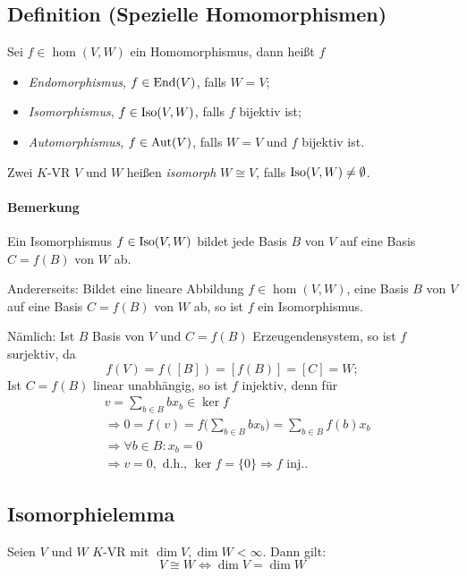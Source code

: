  \subsection{Definition (Spezielle Homomorphismen)}
 	\begin{Definition}
 		Sei $f\in \hom(V,W)$ ein Homomorphismus, dann heißt $f$
 		\begin{itemize}
 			\item \emph{Endomorphismus}, $f\in \operatorname{End} (V)$, falls $W = V$;
 			\item \emph{Isomorphismus}, $f\in \operatorname{Iso}(V,W)$, falls $f$ bijektiv ist;
 			\item \emph{Automorphismus}, $f\in \operatorname{Aut}(V)$, falls $W=V$ und $f$ bijektiv ist.
 		\end{itemize}

 		Zwei $K$-VR $V$ und $W$ heißen \emph{isomorph} $W \cong V$, falls $\operatorname{Iso}(V,W) \neq \emptyset$.
 	\end{Definition}

 	\paragraph{Bemerkung}
 		Ein Isomorphismus $f\in \operatorname{Iso}(V,W)$ bildet jede Basis $B$ von $V$ auf eine Basis $C = f(B)$ von $W$ ab.

 		Andererseits: Bildet eine lineare Abbildung $f\in \hom(V,W)$, eine Basis $B$ von $V$ auf eine Basis $C = f(B)$ von $W$ ab, so ist $f$ ein Isomorphismus.

 		Nämlich: Ist $B$ Basis von $V$ und $ C = f(B)$ Erzeugendensystem, so ist $f$ surjektiv, da
 		\[
 			f(V) = f ([B]) = [f(B)] = [C] = W;
 		\]
 		Ist $C =f(B)$ linear unabhängig, so ist $f$ injektiv, denn für
 		\begin{align*}
 			  & v = \sum_{b\in B} bx_b \in \ker f                                            \\
 			  & \Rightarrow 0 = f(v) = f\Big(\sum_{b\in B}bx_b\Big) = \sum_{b\in B}f(b)x_b   \\
 			  & \Rightarrow \forall b \in B: x_b = 0                                         \\
 			  & \Rightarrow v = 0, \text{ d.h., } \ker f=\{{0}\} \Rightarrow f \text{ inj.}.
 		\end{align*}

 \subsection{Isomorphielemma}
 	\begin{Lemma}[Isomorphielemma]
 		Seien $V$ und $W$ $ K $-VR mit $\dim V, \dim W < \infty$.
 		Dann gilt:
 		\[
 			V \cong W \Leftrightarrow \dim V = \dim W
 		\]
 	\end{Lemma}

